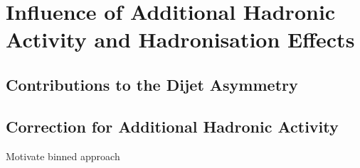 \section{Influence of Additional Hadronic Activity and Hadronisation Effects}\label{sec:ResFit:AddJets}

\subsection{Contributions to the Dijet Asymmetry}\label{sec:ResFit:AddJets:Contributions}

\subsection{Correction for Additional Hadronic Activity}\label{sec:ResFit:AddJets:Extrapolation}
Motivate binned approach
